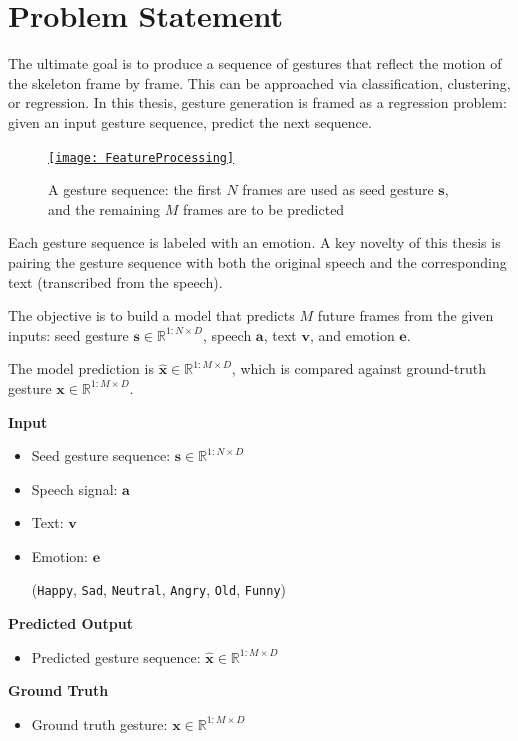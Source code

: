 \section{Problem Statement}
\label{sec:ProblemStatement}

The ultimate goal is to produce a sequence of gestures that reflect the motion of the skeleton frame by frame. This can be approached via classification, clustering, or regression. In this thesis, gesture generation is framed as a regression problem: given an input gesture sequence, predict the next sequence.

\begin{figure}[H]
	\centering
	\href{https://www.youtube.com/watch?v=B6nv1kQmi-Q}{\texttt{[image: FeatureProcessing]}}
	\caption{A gesture sequence: the first $N$ frames are used as seed gesture $\mathbf{s}$, and the remaining $M$ frames are to be predicted}
	\label{fig:GestureSeries}
\end{figure}

Each gesture sequence is labeled with an emotion. A key novelty of this thesis is pairing the gesture sequence with both the original speech and the corresponding text (transcribed from the speech).

The objective is to build a model that predicts $M$ future frames from the given inputs: seed gesture $\mathbf{s} \in \mathbb{R}^{1:N \times D}$, speech $\mathbf{a}$, text $\mathbf{v}$, and emotion $\mathbf{e}$.

The model prediction is $\hat{\mathbf{x}} \in \mathbb{R}^{1:M \times D}$, which is compared against ground-truth gesture $\mathbf{x} \in \mathbb{R}^{1:M \times D}$.

\begin{multicols}{2}
	
\textbf{Input}

\begin{itemize}
	\item Seed gesture sequence: $\mathbf{s} \in \mathbb{R}^{1:N \times D}$
	\item Speech signal: $\mathbf{a}$
	\item Text: $\mathbf{v}$
	\item Emotion: $\mathbf{e}$ 
	
	{\small
		(\texttt{Happy},  \texttt{Sad},  \texttt{Neutral}, \texttt{Angry}, \texttt{Old}, \texttt{Funny})
	}
\end{itemize}

\columnbreak

\textbf{Predicted Output}
\vspace{-10pt}
\begin{itemize}
	\item Predicted gesture sequence: $\hat{\mathbf{x}} \in \mathbb{R}^{1:M \times D}$
\end{itemize}

\textbf{Ground Truth}
\vspace{-10pt}
\begin{itemize}
	\item Ground truth gesture: $ \mathbf{x}  \in \mathbb{R}^{1:M \times D}$
\end{itemize}

\end{multicols}

